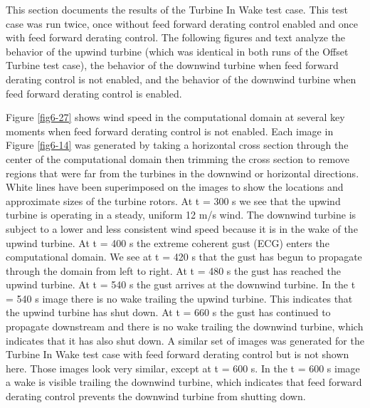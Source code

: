 This section documents the results of the Turbine In Wake test case. This test case was run twice, once without feed forward derating control enabled and once with feed forward derating control. The following figures and text analyze the behavior of the upwind turbine (which was identical in both runs of the Offset Turbine test case), the behavior of the downwind turbine when feed forward derating control is not enabled, and the behavior of the downwind turbine when feed forward derating control is enabled.

Figure \ref{fig6-27} shows wind speed in the computational domain at several key moments when feed forward derating control is not enabled. Each image in Figure \ref{fig6-14} was generated by taking a horizontal cross section through the center of the computational domain then trimming the cross section to remove regions that were far from the turbines in the downwind or horizontal directions. White lines have been superimposed on the images to show the locations and approximate sizes of the turbine rotors. At t = 300 s we see that the upwind turbine is operating in a steady, uniform 12 m/s wind. The downwind turbine is subject to a lower and less consistent wind speed because it is in the wake of the upwind turbine. At t = 400 s the extreme coherent gust (ECG) enters the computational domain. We see at t = 420 s that the gust has begun to propagate through the domain from left to right. At t = 480 s the gust has reached the upwind turbine. At t = 540 s the gust arrives at the downwind turbine. In the t = 540 s image there is no wake trailing the upwind turbine. This indicates that the upwind turbine has shut down. At t = 660 s the gust has continued to propagate downstream and there is no wake trailing the downwind turbine, which indicates that it has also shut down. A similar set of images was generated for the Turbine In Wake test case with feed forward derating control but is not shown here. Those images look very similar, except at t = 600 s. In the t = 600 s image a wake is visible trailing the downwind turbine, which indicates that feed forward derating control prevents the downwind turbine from shutting down.

